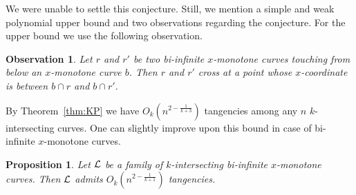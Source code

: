 \documentclass[11pt]{article}
\newtheorem{proposition}{Proposition}
\newtheorem{observation}{Observation}
\theoremstyle{definition}
\def\L{{\cal L}}
\begin{document}
We were unable to settle this conjecture.
Still, we mention a simple and weak polynomial upper bound and two observations regarding the conjecture.
For the upper bound we use the following observation.

\begin{observation}\label{obs:bi-infinite}
	Let $r$ and $r'$ be two bi-infinite $x$-monotone curves touching from below an $x$-monotone curve $b$. Then $r$ and $r'$ cross at a point whose $x$-coordinate is between $b \cap r$ and $b \cap r'$.
\end{observation}

By Theorem~\ref{thm:KP} we have $O_k\left(n^{2-\frac{1}{k+3}}\right)$ tangencies among any $n$ $k$-intersecting curves.
One can slightly improve upon this bound in case of bi-infinite $x$-monotone curves.

\begin{proposition}\label{prop:bi-infinite-k-intersecting-bound}
	Let $\L$ be a family of $k$-intersecting bi-infinite $x$-monotone curves.
	Then $\L$ admits $O_k\left(n^{2-\frac{1}{k+1}}\right)$ tangencies.
\end{proposition}
\end{document}
